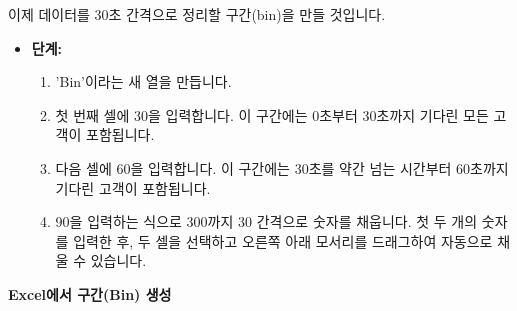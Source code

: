\documentclass[11pt,a4paper]{book}
\providecommand{\captionof}[2]{\textbf{#2}}
\theoremstyle{definition}
\begin{document}
\begin{tcolorbox}[title={구간 (Bin) 생성}]
이제 데이터를 30초 간격으로 정리할 구간(bin)을 만들 것입니다.

\begin{itemize}
    \item \textbf{단계:}
    \begin{enumerate}
        \item 'Bin'이라는 새 열을 만듭니다.
        \item 첫 번째 셀에 30을 입력합니다. 이 구간에는 0초부터 30초까지 기다린 모든 고객이 포함됩니다.
        \item 다음 셀에 60을 입력합니다. 이 구간에는 30초를 약간 넘는 시간부터 60초까지 기다린 고객이 포함됩니다.
        \item 90을 입력하는 식으로 300까지 30 간격으로 숫자를 채웁니다. 첫 두 개의 숫자를 입력한 후, 두 셀을 선택하고 오른쪽 아래 모서리를 드래그하여 자동으로 채울 수 있습니다.
    \end{enumerate}
\end{itemize}

\begin{center}
\captionof{figure}{Excel에서 구간(Bin) 생성}
\label{fig:excel_create_bins}
\end{center}
\end{tcolorbox}
\end{document}
